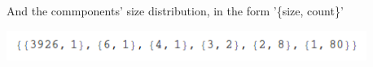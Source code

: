 \documentclass[a4paper, 12pt]{mcshw}
\begin{document}
\begin{enumerate}
\begin{solution}
\begin{center}
            \end{center}
            And the commponents' size distribution, in the form '\{size, count\}'
            \begin{center}
                \includegraphics[height=1cm]{3.png}
            \end{center}
        \end{solution}
\end{enumerate}
\end{document}
